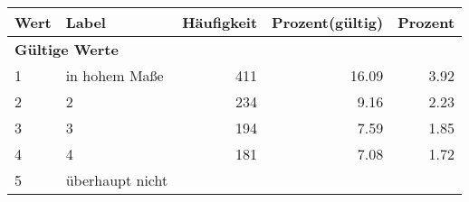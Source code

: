      \begin{longtable}{lXrrr}
     \toprule
     \textbf{Wert} & \textbf{Label} & \textbf{Häufigkeit} & \textbf{Prozent(gültig)} & \textbf{Prozent} \\
     \endhead
     \midrule
     \multicolumn{5}{l}{\textbf{Gültige Werte}}\\

     1 &
     \multicolumn{1}{X}{ in hohem Maße   } &


       \num{411} &
       \num[round-mode=places,round-precision=2]{16,09} &
         \num[round-mode=places,round-precision=2]{3,92} \\

     2 &
     \multicolumn{1}{X}{ 2   } &


       \num{234} &
       \num[round-mode=places,round-precision=2]{9,16} &
         \num[round-mode=places,round-precision=2]{2,23} \\

     3 &
     \multicolumn{1}{X}{ 3   } &


       \num{194} &
       \num[round-mode=places,round-precision=2]{7,59} &
         \num[round-mode=places,round-precision=2]{1,85} \\

     4 &
     \multicolumn{1}{X}{ 4   } &


       \num{181} &
       \num[round-mode=places,round-precision=2]{7,08} &
         \num[round-mode=places,round-precision=2]{1,72} \\

     5 &
     \multicolumn{1}{X}{ überhaupt nicht   } &



\end{longtable}
